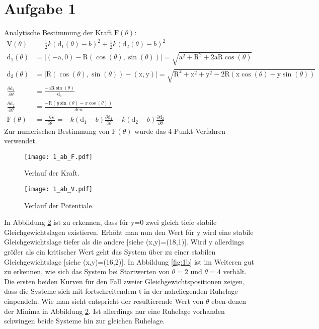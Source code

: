 \documentclass[paper=a4, ngerman]{scrartcl}
\begin{document}
\section*{Aufgabe 1}
Analytische Bestimmung der Kraft $\mathrm{F}(\theta)$:
\begin{align}
    \nonumber \mathrm{V}\left(\theta\right)&=\frac12 k\left(\mathrm{d}_1(\theta)-b\right)^2+\frac12 k\left(\mathrm{d}_2(\theta)-b\right)^2\\[5pt]
    \nonumber \mathrm{d}_1(\theta)&=\vert (-\mathrm{a},0) - \mathrm{R}(\cos(\theta),\sin(\theta))\vert = \sqrt{\mathrm{a}^2+\mathrm{R}^2+2\mathrm{aR}\cos(\theta)}\\[5pt]
    \nonumber \mathrm{d}_2(\theta)&=\vert \mathrm{R}(\cos(\theta),\sin(\theta)) - (\mathrm{x},\mathrm{y})\vert =\sqrt{\mathrm{R}^2+\mathrm{x}^2+\mathrm{y}^2-2\mathrm{R}\left(\mathrm{x}\cos(\theta)-\mathrm{y}\sin(\theta)\right)}\\[5pt]
    \nonumber \frac{\partial\mathrm{d}_1}{\partial\theta}&= \frac{-\mathrm{aR}\sin(\theta)}{\mathrm{d}_1}\\[5pt]
    \nonumber \frac{\partial\mathrm{d}_2}{\partial\theta}&= \frac{-\mathrm{R}\left(y\sin(\theta)-x\cos(\theta)\right)}{den}\\[5pt]
    \nonumber \mathrm{F}(\theta)&=\frac{-\partial\mathrm{V}}{\partial\theta}=-k\left(\mathrm{d}_1-b\right)\frac{\partial \mathrm{d}_1}{\partial\theta}-k\left(\mathrm{d}_2-b\right)\frac{\partial \mathrm{d}_2}{\partial\theta}
\end{align}
Zur numerischen Bestimmung von $\mathrm{F}(\theta)$ wurde das 4-Punkt-Verfahren verwendet.

\begin{figure}[htbp]
	\centering
	\texttt{[image: 1\_ab\_F.pdf]}
	\caption{Verlauf der Kraft.}
	\label{fig:1F}
\end{figure}

\begin{figure}[htbp]
	\centering
	\texttt{[image: 1\_ab\_V.pdf]}
	\caption{Verlauf der Potentiale.}
	\label{fig:1V}
\end{figure}
In Abbildung \ref{fig:1V} ist zu erkennen, dass für y=0 zwei gleich tiefe stabile Gleichgewichtslagen existieren. Erhöht man nun den Wert für y wird eine stabile Gleichgewichtslage tiefer als die andere [siehe (x,y)=(18,1)]. Wird y allerdings größer als ein kritischer Wert geht das System über zu einer stabilen Gleichgewichtslage [siehe (x,y)=(16,2)]. In Abbildung \ref{fig:1b} ist im Weiteren gut zu erkennen, wie sich das System bei Startwerten von $\theta=2$ und $\theta=4$ verhält. Die ersten beiden Kurven für den Fall zweier Gleichgewichtspositionen zeigen, dass die Systeme sich mit fortschreitendem t in der naheliegenden Ruhelage einpendeln. Wie man sieht entspricht der resultierende Wert von $\theta$ eben denen der Minima in Abbildung \ref{fig:1V}. Ist allerdings nur eine Ruhelage vorhanden schwingen beide Systeme hin zur gleichen Ruhelage.
\end{document}
